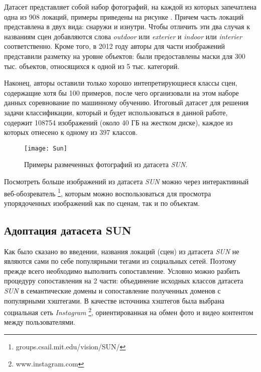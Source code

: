 \indent
Датасет представляет собой набор фотографий, на каждой из которых запечатлена
одна из 908 локаций, примеры приведены на рисунке \cite{tikzpicture: sun}. Причем
часть локаций представлена в двух
вида: снаружи и изнутри. Чтобы отличить эти два случая к названиям сцен добавляются слова \textit{outdoor} или \textit{exterier} и \textit{indoor} или \textit{interier} соответственно.
Кроме того, в 2012 году авторы для части изображений представили разметку 
на уровне объектов: были предоставлены маски для 300 тыс. объектов, относящихся
к одной из 5 тыс. категорий.

\indent
Наконец, авторы оставили только хорошо интепретирующиеся классы сцен, 
содержащие хотя бы 100 примеров, после чего организовали на этом
наборе данных соревнование по машинному обучению. Итоговый датасет
для решения задачи классификации,
который и будет использоваться в данной работе,
содержит 108754 изображений (около 40 ГБ на жестком диске), каждое 
из которых отнесено к одному из 397 классов.

\begin{figure}[h]
    \begin{center}
   	    \texttt{[image: Sun]}
   	\end{center}
   	\caption{Примеры размеченных фотографий из датасета \textit{SUN}.}
   	\label{tikzpicture: sun}
\end{figure}

Посмотреть больше изображений из датасета \textit{SUN} можно через 
интерактивный веб-обозреватель \footnote{groups.csail.mit.edu/vision/SUN/}, которым
можно воспользоваться для просмотра упорядоченных изображений как 
по сценам, так и по объектам.


\subsection{Адоптация датасета SUN}

\indent
\indent
Как было сказано во введении, названия локаций (сцен) из датасета \textit{SUN} не 
являются сами по себе популярными тегами из социальных сетей. Поэтому 
прежде всего необходимо выполнить сопоставление. Условно можно
разбить процедуру сопоставления на 2 части: объединение исходных классов 
датасета \textit{SUN} в семантические домены и сопоставление полученных доменов
с популярными хэштегами. В качестве источника хэштегов была выбрана социальная
сеть \textit{Instagram} \footnote{www.instagram.com}, ориентированная на обмен фото
и видео контентом между пользователями.

